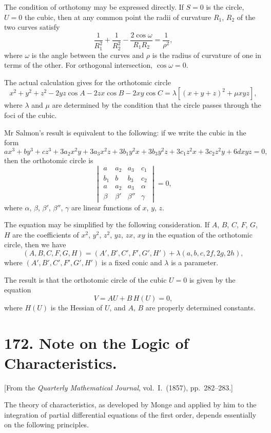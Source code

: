 \documentclass[11pt,a4paper]{book}
\begin{document}
The condition of orthotomy may be expressed directly. If $S=0$ is the circle, $U=0$ the cubic, then at any common point the radii of curvature $R_1$, $R_2$ of the two curves satisfy
\[
\frac{1}{R_1^2} + \frac{1}{R_2^2} - \frac{2\cos\omega}{R_1 R_2} = \frac{1}{\rho^2},
\]
where $\omega$ is the angle between the curves and $\rho$ is the radius of curvature of one in terms of the other. For orthogonal intersection, $\cos\omega=0$.

The actual calculation gives for the orthotomic circle
\[
x^2+y^2+z^2-2yz\cos A-2zx\cos B-2xy\cos C
= \lambda\left[(x+y+z)^2 + \mu xyz\right],
\]
where $\lambda$ and $\mu$ are determined by the condition that the circle passes through the foci of the cubic.

Mr Salmon's result is equivalent to the following: if we write the cubic in the form
\[
ax^3+by^3+cz^3+3a_2x^2y+3a_3x^2z+3b_1y^2x+3b_3y^2z+3c_1z^2x+3c_2z^2y+6dxyz = 0,
\]
then the orthotomic circle is
\[
\begin{vmatrix}
a & a_2 & a_3 & c_1 \\
b_1 & b & b_3 & c_2 \\
a & a_2 & a_3 & \alpha \\
\beta & \beta' & \beta'' & \gamma
\end{vmatrix} = 0,
\]
where $\alpha$, $\beta$, $\beta'$, $\beta''$, $\gamma$ are linear functions of $x$, $y$, $z$.

The equation may be simplified by the following consideration. If $A$, $B$, $C$, $F$, $G$, $H$ are the coefficients of $x^2$, $y^2$, $z^2$, $yz$, $zx$, $xy$ in the equation of the orthotomic circle, then we have
\[
(A,B,C,F,G,H) = (A',B',C',F',G',H') + \lambda(a,b,c,2f,2g,2h),
\]
where $(A',B',C',F',G',H')$ is a fixed conic and $\lambda$ is a parameter.

The result is that the orthotomic circle of the cubic $U=0$ is given by the equation
\[
V = AU + B\, H(U) = 0,
\]
where $H(U)$ is the Hessian of $U$, and $A$, $B$ are properly determined constants.


\newpage
\section*{172. Note on the Logic of Characteristics.}

[From the \textit{Quarterly Mathematical Journal}, vol.~I.~(1857), pp.~282--283.]

The theory of characteristics, as developed by Monge and applied by him to the integration of partial differential equations of the first order, depends essentially on the following principles.
\end{document}
